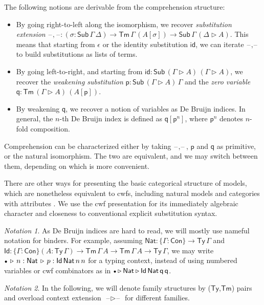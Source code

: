 \documentclass[12pt,a4paper,twoside,openany]{book}
\theoremstyle{remark}
\newtheorem{notation}{Notation}
\theoremstyle{definition}
\theoremstyle{theorem}
\newcommand{\ms}[1]{\mathsf{#1}}
\newcommand{\id}{\mathsf{id}}
\newcommand{\Con}{\mathsf{Con}}
\newcommand{\Sub}{\mathsf{Sub}}
\newcommand{\Tm}{\mathsf{Tm}}
\newcommand{\Ty}{\mathsf{Ty}}
\newcommand{\Id}{\mathsf{Id}}
\newcommand{\blank}{\mathord{\hspace{1pt}\text{--}\hspace{1pt}}}
\newcommand{\ext}{\triangleright}
\newcommand{\emptycon}{\scaleobj{.75}\bullet}
\newcommand{\p}{\mathsf{p}}
\newcommand{\q}{\mathsf{q}}
\newcommand{\Nat}{\ms{Nat}}
\begin{document}
The following notions are derivable from the comprehension structure:
\begin{itemize}
\item
  By going right-to-left along the isomorphism, we recover \emph{substitution
  extension} $\blank,\blank : (\sigma : \Sub\,\Gamma\,\Delta) \to
  \Tm\,\Gamma\,(A[\sigma]) \to \Sub\,\Gamma\,(\Delta\ext A)$. This means that
  starting from $\epsilon$ or the identity substitution $\id$, we can iterate
  $\blank,\blank$ to build substitutions as lists of terms.
\item
  By going left-to-right, and starting from $\id : \Sub\,(\Gamma\ext
  A)\,(\Gamma\ext A)$, we recover the \emph{weakening substitution} $\p :
  \Sub\,(\Gamma\ext A)\,\Gamma$ and the \emph{zero variable} $\q :
  \Tm\,(\Gamma\ext A)\,(A[\p])$.
\item
  By weakening $\q$, we recover a notion of variables as De Bruijn indices. In
  general, the $n$-th De Bruijn index is defined as $\q[\p^{n}]$, where $\p^{n}$
  denotes $n$-fold composition.
\end{itemize}

Comprehension can be characterized either by taking $\blank,\blank$, $\p$ and
$\q$ as primitive, or the natural isomorphism. The two are equivalent, and we
may switch between them, depending on which is more convenient.

There are other ways for presenting the basic categorical structure of models,
which are nonetheless equivalent to cwfs, including natural models
\cite{awodey18natural} and categories with attributes \cite{cartmellthesis}. We
use the cwf presentation for its immediately algebraic character and closeness
to conventional explicit substitution syntax.

\begin{notation}As De Bruijn indices are hard to read, we will mostly use
nameful notation for binders. For example, assuming $\Nat : \{\Gamma : \Con\}
\to \Ty\,\Gamma$ and $\Id : \{\Gamma : \Con\}(A : \Ty\,\Gamma) \to
\Tm\,\Gamma\,A \to \Tm\,\Gamma\,A \to \Ty\,\Gamma$, we may write $\emptycon\,\ext\,
n : \Nat\,\ext\,p : \Id\,\Nat\,n\,n$ for a typing context, instead of using
numbered variables or cwf combinators as in $\emptycon \ext \Nat \ext
\Id\,\Nat\,\q\,\q$.
\end{notation}

\begin{notation}
In the following, we will denote family structures by ($\Ty$,$\Tm$) pairs and overload context
extension $\blank\ext\blank$ for different families.
\end{notation}
\end{document}
